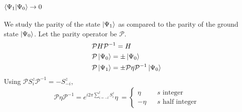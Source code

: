\documentclass{beamer}
\begin{document}
\begin{frame}
    \frametitle{$\braket{\Psi_1|\Psi_0} \rightarrow 0 $}
    We study the parity of the state $\ket{\Psi_1}$ as compared to the parity of the ground state $\ket{\Psi_0}$. Let the parity operator be $\mathcal{P}$. 
    \begin{align*}
        &\mathcal{P} H \mathcal{P}^{-1} = H \nonumber \\ 
        &\mathcal{P} \ket{\Psi_0} = \pm \ket{\Psi_0} \nonumber \\ 
        &\mathcal{P} \ket{\Psi_1} = \pm \mathcal{P} \eta \mathcal{P}^{-1} \ket{\Psi_0} 
    \end{align*}
    \pause 
    Using $\mathcal{P} S^z_i \mathcal{P}^{-1} = -S^z_{-i}$, 
    \begin{align*}
        \mathcal{P} \eta \mathcal{P}^{-1} = e^{i2\pi \sum_{i=-l}^{l} S^z_i} \eta \ = \left\{
        \begin{matrix}
            \eta && s \text{ integer} \\
            -\eta && s \text{ half integer} 
        \end{matrix}
        \right.
    \end{align*}
    
\end{frame}
\end{document}
